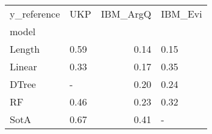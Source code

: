 \begin{tabular}{llrl}
\toprule
y\_reference &   UKP &  IBM\_ArgQ & IBM\_Evi \\
model  &       &           &         \\
\midrule
Length &  0.59 &      0.14 &    0.15 \\
Linear &  0.33 &      0.17 &    0.35 \\
DTree  &     - &      0.20 &    0.24 \\
RF     &  0.46 &      0.23 &    0.32 \\
SotA   &  0.67 &      0.41 &       - \\
\bottomrule
\end{tabular}
